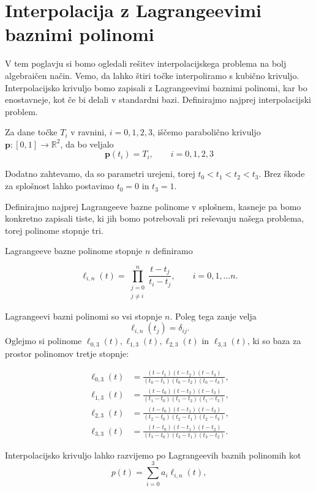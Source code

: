 \documentclass[mat1]{fmfdelo}
\newcommand{\R}{\mathbb R}
\begin{document}
\section{Interpolacija z Lagrangeevimi baznimi polinomi}

V tem poglavju si bomo ogledali rešitev interpolacijskega problema na bolj algebraičen način. Vemo, da lahko štiri točke interpoliramo s kubično krivuljo. Interpolacijsko krivuljo bomo zapisali z Lagrangeevimi baznimi polinomi, kar bo enostavneje, kot če bi delali v standardni bazi. Definirajmo najprej interpolacijski problem.

Za dane točke $T_i$ v ravnini, $i = 0, 1, 2, 3$, iščemo parabolično krivuljo $\textbf{p} : [ 0, 1 ] \rightarrow \R^2$, da bo veljalo $$\textbf{p}(t_i) = T_i, \qquad i = 0, 1, 2, 3$$ 

Dodatno zahtevamo, da so parametri urejeni, torej $t_0 < t_1 < t_2 < t_3$. Brez škode za splošnost lahko postavimo $t_0 = 0$ in $t_3 = 1$.

Definirajmo najprej Lagrangeeve bazne polinome v splošnem, kasneje pa bomo konkretno zapisali tiste, ki jih bomo potrebovali pri reševanju našega problema, torej polinome stopnje tri.


\begin{definicija}
Lagrangeeve bazne polinome stopnje $n$ definiramo

$$ \ell_{i,n}(t) = \prod_{\substack{j=0 \\ j \neq i}}^{n} \frac{t - t_j}{t_i - t_j} , \qquad i = 0, 1, \ldots n.$$	
\end{definicija}

Lagrangeevi bazni polinomi so vsi stopnje $n$. Poleg tega zanje velja $$\ell_{i,n}(t_j) = \delta_{ij}.$$
Oglejmo si polinome $ \ell_{0,3}(t), \ell_{1,3}(t), \ell_{2,3}(t)$ in $ \ell_{3,3}(t) $, ki so baza za prostor polinomov tretje stopnje:

\begin{align*}
	\ell_{0,3}(t) &= \frac{(t - t_1)(t - t_2)(t - t_3)}{(t_0 - t_1)(t_0 - t_2)(t_0 - t_3)}, \\
	\ell_{1,3}(t) &= \frac{(t - t_0)(t - t_2)(t - t_2)}{(t_1 - t_0)(t_1 - t_2)(t_1 - t_3)}, \\
	\ell_{2,3}(t) &= \frac{(t - t_0)(t - t_1)(t - t_3)}{(t_2 - t_0)(t_2 - t_1)(t_2 - t_3)}, \\
	\ell_{3,3}(t) &= \frac{(t - t_0)(t - t_1)(t - t_2)}{(t_3 - t_0)(t_3 - t_1)(t_3 - t_2)}. 	
\end{align*}

Interpolacijsko krivuljo lahko razvijemo po Lagrangeevih baznih polinomih kot 
\begin{equation}\label{razvoj}
p(t) = \sum_{i=0}^{3} a_i \ell_{i,n}(t),
\end{equation}
\end{document}
